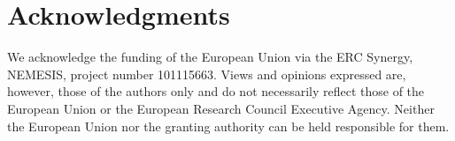 \documentclass[a4paper,11pt]{article}
\theoremstyle{definition}
\theoremstyle{remark}
\begin{document}
\FloatBarrier
\section*{Acknowledgments}

We acknowledge the funding of the European Union via the ERC Synergy, NEMESIS, project number 101115663.
Views and opinions expressed are, however, those of the authors only and do not necessarily reflect those of the European Union or the European Research Council Executive Agency.
Neither the European Union nor the granting authority can be held responsible for them.





\end{document}
